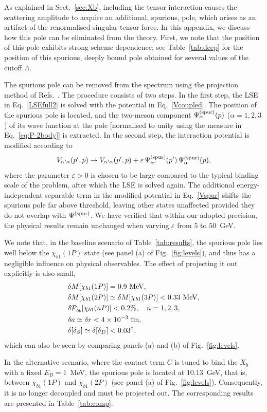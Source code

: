 \documentclass[aps,prd,showpacs,amsmath,twocolumn,superscriptaddress,floatfix,nofootinbib,notitlepage]{revtex4-2}
\newcommand{\be}{\begin{equation}}
\newcommand{\ee}{\end{equation}}
\newcommand{\Xb}{X_b}
\begin{document}
As explained in Sect.~\ref{sec:Xb}, including the tensor interaction causes the scattering amplitude to acquire an additional, spurious, pole, which arises as an artifact of the renormalised singular tensor force. In this appendix, we discuss how this pole can be eliminated from the theory. First, we note that the position of this pole exhibits strong scheme dependence; see Table~\ref{tab:deep} for the position of this spurious, deeply bound pole obtained for several values of the cutoff $\Lambda$. 

The spurious pole can be removed from the spectrum using the projection method of Refs.~\cite{Kukulin:1978he,Epelbaum:2002ji,Nogga:2005hy,Yang:2020pgi}. The procedure consists of two steps.
In the first step, the LSE in Eq.~\eqref{LSEfull2} is solved with the potential in Eq.~\eqref{Vcoupled}. The position of the spurious pole is located, and the two-meson component $\Psi^{\rm (spur)}_\alpha(p)$ ($\alpha=1,2,3$) of its wave function at the pole [normalised to unity using the measure in Eq.~\eqref{eq:P-2body}] is extracted. 
In the second step, the interaction potential is modified according to
\be
V_{\alpha'\alpha}(p',p)\to V_{\alpha'\alpha}(p',p)+\varepsilon\,\Psi^{\rm (spur)}_{\alpha'}(p')\,\Psi^{\rm (spur)}_\alpha(p),
\label{Vspur}
\ee
where the parameter $\varepsilon>0$ is chosen to be large compared to the typical binding scale of the problem, after which the LSE is solved again. The additional energy-independent separable term in the modified potential in Eq.~\eqref{Vspur} shifts the spurious pole far above threshold, leaving other states unaffected provided they do not overlap with $\Psi^{\rm (spur)}$. 
We have verified that within our adopted precision, the physical results remain unchanged when varying $\varepsilon$ from $5$ to $50$~GeV. 

We note that, in the baseline scenario of Table~\ref{tab:results}, the spurious pole lies well below the $\chi_{b1}(1P)$ state (see panel (a) of Fig.~\ref{fig:levels}), and thus has a negligible influence on physical observables. The effect of projecting it out explicitly is also small,
\be
\begin{split}
&\delta M[\chi_{b1}(1P)]=0.9~\mbox{MeV},\\
&\delta M[\chi_{b1}(2P)]\simeq 
\delta M[\chi_{b1}(3P)]<0.33~\mbox{MeV},\\
&\delta {\cal P}_{\bar{b}b}[\chi_{b1}(nP)]<0.2\%,\quad n=1,2,3,\\
&\delta a\simeq \delta r < 4\times 10^{-3}~\mbox{fm},\\
&\delta[\delta_S]\simeq\delta[\delta_D]<0.03^\circ,
\end{split}
\ee
which can also be seen by comparing panels (a) and (b) of Fig.~\ref{fig:levels}.

In the alternative scenario, where the contact term $C$ is tuned to bind the $\Xb$ with a fixed $E_B=1$~MeV, the spurious pole is located at $10.13$~GeV, that is, between $\chi_{b1}(1P)$ and $\chi_{b1}(2P)$ (see panel (a) of Fig.~\ref{fig:levels}). Consequently, it is no longer decoupled and must be projected out. The corresponding results are presented in Table~\ref{tab:comp}.


\end{document}
